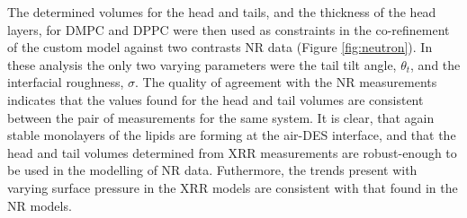 \documentclass[twocolumn,a4paper]{paper}
\begin{document}
The determined volumes for the head and tails, and the thickness of the head layers, for DMPC and DPPC were then used as constraints in the co-refinement of the custom model against two contrasts NR data (Figure \ref{fig:neutron}). In these analysis the only two varying parameters were the tail tilt angle, $\theta_t$, and the interfacial roughness, $\sigma$.
The quality of agreement with the NR measurements indicates that the values found for the head and tail volumes are consistent between the pair of measurements for the same system.
It is clear, that again stable monolayers of the lipids are forming at the air-DES interface, and that the head and tail volumes determined from XRR measurements are robust-enough to be used in the modelling of NR data.
Futhermore, the trends present with varying surface pressure in the XRR models are consistent with that found in the NR models.
\end{document}
